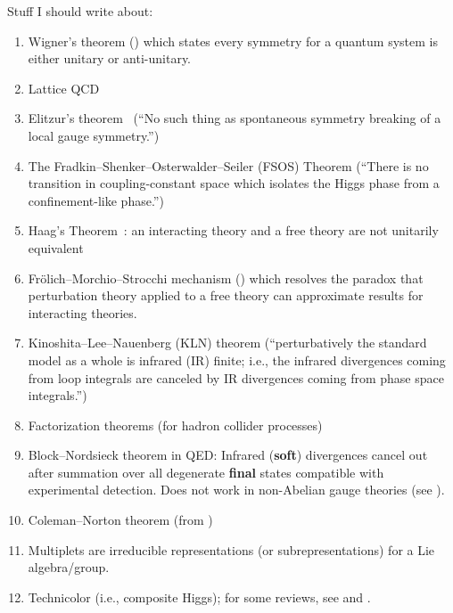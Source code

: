 Stuff I should write about:
\begin{enumerate}
\item Wigner's theorem () which states every symmetry
  for a quantum system is either unitary or anti-unitary.
\item Lattice QCD~\cite{Lepage:1998dt}
\item Elitzur's theorem~\cite{Elitzur:1975im} (``No such thing as spontaneous symmetry breaking of a local gauge symmetry.'')
\item The Fradkin--Shenker--Osterwalder--Seiler (FSOS) Theorem (``There is no transition in coupling-constant space which isolates the Higgs phase from a confinement-like phase.'')
\item Haag's Theorem~\cite{Haag:1992hx}: an interacting theory and a
  free theory are not unitarily equivalent
\item Fr\"{o}lich--Morchio--Strocchi mechanism ()
  which resolves the paradox that perturbation theory applied to a free
  theory can approximate results for interacting theories.
\item Kinoshita--Lee--Nauenberg (KLN) theorem (``perturbatively the standard model as a whole is infrared (IR) finite; i.e., the infrared divergences coming from loop integrals are canceled by IR divergences coming from phase space integrals.'')
\item Factorization theorems (for hadron collider processes) 
\item Block--Nordsieck theorem in QED: Infrared (\textbf{soft}) divergences
  cancel out after summation over all degenerate \textbf{final} states
  compatible with experimental detection. Does not work in non-Abelian
  gauge theories (see {\tt{}}).
\item Coleman--Norton theorem (from {\tt{}})
\item Multiplets are irreducible representations (or subrepresentations)
  for a Lie algebra/group.
\item Technicolor (i.e., composite Higgs); for some reviews, see
   and .
\end{enumerate}






